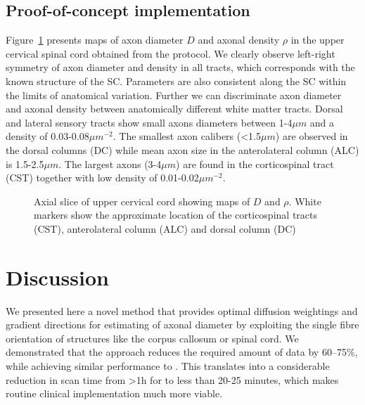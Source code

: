 \subsection{Proof-of-concept implementation}
Figure~\ref{fig:chapter7 exp1 monkey data} presents maps of axon diameter $D$ and axonal density $\rho$ in the upper cervical spinal cord obtained from the {\FD} protocol. We clearly observe left-right symmetry of axon diameter and density in all tracts, which corresponds with the known structure of the SC. Parameters are also consistent along the SC within the limits of anatomical variation. Further we can discriminate axon diameter and axonal density between anatomically different white matter tracts. Dorsal and lateral sensory tracts show small axons diameters between 1-4$\mu m$ and a density of 0.03-0.08$\mu m^{-2}$. The smallest axon calibers (<1.5$\mu m$) are observed in the dorsal columns (DC) while mean axon size in the anterolateral column (ALC) is 1.5-2.5$\mu m$. The largest axons (3-4$\mu m$) are found in the corticospinal tract (CST) together with low density of 0.01-0.02$\mu m^{-2}$.

\begin{figure}[h!]
	\centering
	\hspace{2cm}
	\caption{Axial slice of upper cervical cord showing maps of $D$ and $\rho$. White markers show the approximate location of the corticospinal tracts (CST), anterolateral column (ALC) and dorsal column (DC)}
	\label{fig:chapter7 exp1 monkey data}
\end{figure}

\FloatBarrier

\section{Discussion}
We presented here a novel method that provides optimal diffusion weightings and gradient directions for estimating of axonal diameter by exploiting the single fibre orientation of structures like the corpus callosum or spinal cord. We demonstrated that the {\SF} approach reduces the required amount of data by 60--75\%, while achieving similar performance to {\OI}. This translates into a considerable reduction in scan time from >1h for {\OI} to less than 20-25 minutes, which makes routine clinical implementation much more viable.  

